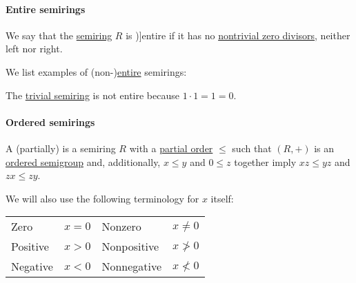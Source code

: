 \paragraph{Entire semirings}

\begin{definition}\label{def:entire_semiring}
  We say that the \hyperref[def:semiring]{semiring} \( R \) is \term[ru=целостное (\cite[def. 3.5.1]{Винберг2014})]{entire} if it has no \hyperref[def:divisibility]{nontrivial zero divisors}, neither left nor right.
\end{definition}

\begin{example}\label{ex:def:entire_semiring}
  We list examples of (non-)\hyperref[def:entire_semiring]{entire} semirings:
  \begin{thmenum}
     The \hyperref[def:semiring/trivial]{trivial semiring} is not entire because \( 1 \cdot 1 = 1 = 0 \).
  \end{thmenum}
\end{example}

\paragraph{Ordered semirings}

\begin{definition}\label{def:ordered_semiring}
  A (partially)  is a semiring \( R \) with a \hyperref[def:partially_ordered_set]{partial order} \( \leq \) such that \( (R, +) \) is an \hyperref[def:ordered_semigroup]{ordered semigroup} and, additionally, \( x \leq y \) and \( 0 \leq z \) together imply \( xz \leq yz \) and \( zx \leq zy \).

  We will also use the following terminology for \( x \) itself:
  \begin{center}
    \begin{tabular}{l | l || l | l}
      Zero        & \( x = 0 \) & Nonzero     & \( x \neq 0 \) \\
      Positive    & \( x > 0 \) & Nonpositive & \( x \not> 0 \) \\
      Negative    & \( x < 0 \) & Nonnegative & \( x \not< 0 \)
    \end{tabular}
  \end{center}
\end{definition}

